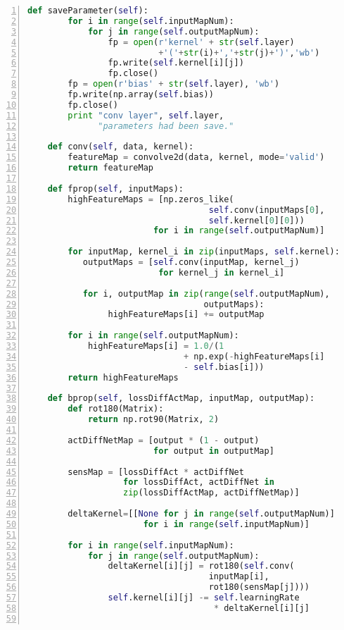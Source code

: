 \begin{lstlisting}[language=Python,numbers=left, frame=shadowbox, rulesepcolor=\color{cadegrey}, caption=\text{ConvLayer.py}]
    def saveParameter(self):
        for i in range(self.inputMapNum):
            for j in range(self.outputMapNum):
                fp = open(r'kernel' + str(self.layer) 
                          +'('+str(i)+','+str(j)+')','wb')
                fp.write(self.kernel[i][j])
                fp.close()
        fp = open(r'bias' + str(self.layer), 'wb')
        fp.write(np.array(self.bias))
        fp.close()
        print "conv layer", self.layer, 
              "parameters had been save."

    def conv(self, data, kernel):
        featureMap = convolve2d(data, kernel, mode='valid')
        return featureMap

    def fprop(self, inputMaps):
        highFeatureMaps = [np.zeros_like(
                                    self.conv(inputMaps[0], 
                                    self.kernel[0][0]))
                         for i in range(self.outputMapNum)]

        for inputMap, kernel_i in zip(inputMaps, self.kernel):
           outputMaps = [self.conv(inputMap, kernel_j) 
                          for kernel_j in kernel_i]

           for i, outputMap in zip(range(self.outputMapNum),
                                   outputMaps):
                highFeatureMaps[i] += outputMap

        for i in range(self.outputMapNum):
            highFeatureMaps[i] = 1.0/(1 
                               + np.exp(-highFeatureMaps[i]
                               - self.bias[i]))
        return highFeatureMaps

    def bprop(self, lossDiffActMap, inputMap, outputMap):
        def rot180(Matrix):
            return np.rot90(Matrix, 2)

        actDiffNetMap = [output * (1 - output) 
                         for output in outputMap]

        sensMap = [lossDiffAct * actDiffNet 
                   for lossDiffAct, actDiffNet in 
                   zip(lossDiffActMap, actDiffNetMap)]

        deltaKernel=[[None for j in range(self.outputMapNum)]
                       for i in range(self.inputMapNum)]

        for i in range(self.inputMapNum):
            for j in range(self.outputMapNum):
                deltaKernel[i][j] = rot180(self.conv(
                                    inputMap[i], 
                                    rot180(sensMap[j])))
                self.kernel[i][j] -= self.learningRate 
                                     * deltaKernel[i][j]


\end{lstlisting}
